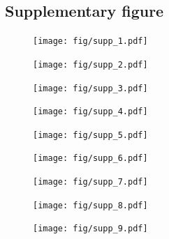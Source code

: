 \documentclass[sn-mathphys-num]{sn-jnl}%
\theoremstyle{thmstyleone}%
\theoremstyle{thmstyletwo}%
\theoremstyle{thmstylethree}%
\begin{document}
\begin{appendices}
\begin{table}[htbp]
\begin{tabular}{ccc}
		\bottomrule
	\end{tabular}%
	\label{tab:spatial_wavelength}%
\end{table}%


\subsection{Supplementary figure}\label{secS1}



\begin{figure}[!htb] 
	\centering
	\texttt{[image: fig/supp\_1.pdf]}
	\caption{} \label{fig:supp_1}
\end{figure}


\begin{figure}[!htb] 
	\centering
	\texttt{[image: fig/supp\_2.pdf]}
	\caption{} \label{fig:supp_2}
\end{figure}


\begin{figure}[!htb] 
	\centering
	\texttt{[image: fig/supp\_3.pdf]}
	\caption{} \label{fig:supp_3}
\end{figure}


\begin{figure}[!htb] 
	\centering
	\texttt{[image: fig/supp\_4.pdf]}
	\caption{} \label{fig:supp_4}
\end{figure}




\begin{figure}[!htb] 
	\centering
	\texttt{[image: fig/supp\_5.pdf]}
	\caption{} \label{fig:supp_5}
\end{figure}


\begin{figure}[!htb] 
	\centering
	\texttt{[image: fig/supp\_6.pdf]}
	\caption{
	} \label{fig:supp_6}
\end{figure}


\begin{figure}[!htb] 
	\centering
	\texttt{[image: fig/supp\_7.pdf]}
	\caption{
	} \label{fig:supp_7}
\end{figure}


\begin{figure}[!htb] 
	\centering
	\texttt{[image: fig/supp\_8.pdf]}
	\caption{
	} \label{fig:supp_8}
\end{figure}


\begin{figure}[!htb] 
	\centering
	\texttt{[image: fig/supp\_9.pdf]}
	\caption{
	} \label{fig:supp_9}
\end{figure}




\end{appendices}
\end{document}
